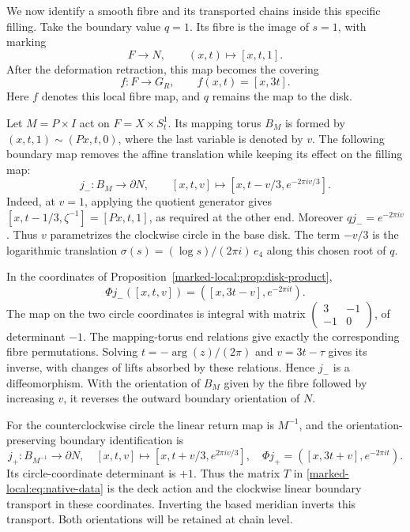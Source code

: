 We now identify a smooth fibre and its transported chains inside this
specific filling. Take the boundary value $q=1$. Its fibre is the
image of $s=1$, with marking
\begin{equation}\label{marked-local:eq:fibre-inclusion}
 F\longrightarrow N,\qquad (x,t)\longmapsto[x,t,1].
\end{equation}
After the deformation retraction, this map becomes the covering
\begin{equation}\label{marked-local:eq:cover-map}
             f:F\longrightarrow G_R,
             \qquad f(x,t)=[x,3t].
\end{equation}
Here $f$ denotes this local fibre map, and $q$ remains the map to the disk.

Let $M=P\times I$ act on $F=X\times S^1_t$.
Its mapping torus $B_M$ is formed by
$(x,t,1)\sim(Px,t,0)$, where the last variable is denoted by $v$.
The following boundary map removes the affine translation while keeping
its effect on the filling map:
\begin{equation}\label{marked-local:eq:clockwise-boundary}
 j_-:B_M\longrightarrow\partial N,
 \qquad [x,t,v]\longmapsto
       [x,t-v/3,e^{-2\pi iv/3}].
\end{equation}
Indeed, at $v=1$, applying the quotient generator gives
$[x,t-1/3,\zeta^{-1}]=[Px,t,1]$, as required at the other end.
Moreover $qj_-=e^{-2\pi iv}$. Thus $v$ parametrizes the clockwise
circle in the base disk. The term $-v/3$ is the logarithmic translation
$\sigma(s)=(\log s)/(2\pi i)\,e_4$ along this chosen root of $q$.

In the coordinates of Proposition~\ref{marked-local:prop:disk-product},
\begin{equation}\label{marked-local:eq:boundary-product}
       \Phi j_-([x,t,v])=([x,3t-v],e^{-2\pi it}).
\end{equation}
The map on the two circle coordinates is integral with matrix
$\left(\begin{smallmatrix}3&-1\\-1&0\end{smallmatrix}\right)$,
of determinant $-1$. The mapping-torus end relations give exactly the
corresponding fibre permutations. Solving $t=-\arg(z)/(2\pi)$ and
$v=3t-\tau$ gives its inverse, with changes of lifts absorbed by
these relations. Hence $j_-$ is a diffeomorphism. With the orientation
of $B_M$ given by the fibre followed by increasing $v$, it reverses
the outward boundary orientation of $N$.

For the counterclockwise circle the linear return map is $M^{-1}$,
and the orientation-preserving boundary identification is
\begin{equation}\label{marked-local:eq:counterclockwise-boundary}
 j_+:B_{M^{-1}}\longrightarrow\partial N,
 \quad [x,t,v]\longmapsto[x,t+v/3,e^{2\pi iv/3}],
 \quad \Phi j_+=([x,3t+v],e^{-2\pi it}).
\end{equation}
Its circle-coordinate determinant is $+1$.
Thus the matrix $T$ in \eqref{marked-local:eq:native-data} is the deck action
and the clockwise linear boundary transport in these coordinates.
Inverting the based meridian inverts this transport. Both orientations
will be retained at chain level.


